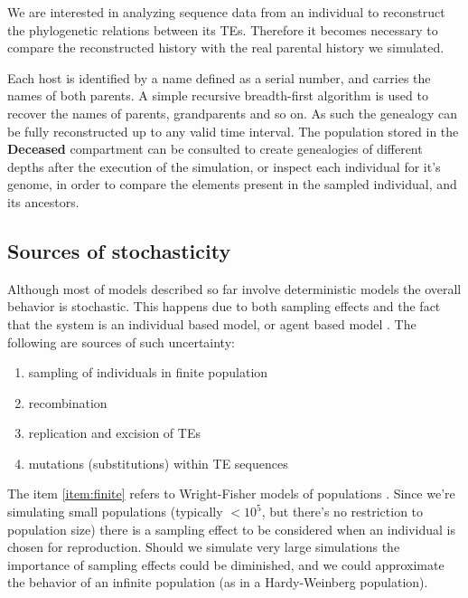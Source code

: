 \documentclass[10pt]{article}
\begin{document}
We are interested in analyzing sequence data from an individual to
reconstruct the phylogenetic relations between its TEs. Therefore it
becomes necessary to compare the reconstructed history with the real
parental history we simulated.

Each host is identified by a name defined as a serial number, and
carries the names of both parents. A simple recursive breadth-first
algorithm is used to recover the names of parents, grandparents and so
on. As such the genealogy can be fully reconstructed up to any valid
time interval. The population stored in the {\bf Deceased}
compartment can be consulted to create genealogies of different depths
after the execution of the simulation, or inspect each individual for
it's genome, in order to compare the elements present in the sampled
individual, and its ancestors.

\subsection{Sources of stochasticity}
Although most of models described so far involve deterministic models
the overall behavior is stochastic. This happens due to both sampling
effects and the fact that the system is an individual based model, or
agent based model \cite{Bon02}. The following are sources of such
uncertainty:

\begin{enumerate}

\item sampling of individuals in finite population
\label{item:finite}

\item recombination
\label{item:recombination}

\item replication and excision of TEs
\label{item:transposition}

\item mutations (substitutions) within TE sequences
\label{item:mutation}

\end{enumerate}

The item \ref{item:finite} refers to Wright-Fisher models of
populations \cite{HC98}. Since we're simulating small populations
(typically $<10^5$, but there's no restriction to population size)
there is a sampling effect to be considered when an individual is
chosen for reproduction. Should we simulate very large simulations the
importance of sampling effects could be diminished, and we could
approximate the behavior of an infinite population (as in a
Hardy-Weinberg population).
\end{document}
